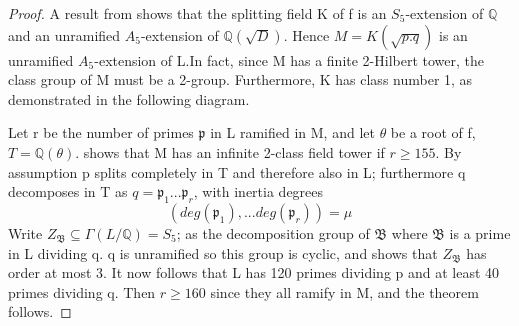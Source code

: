 \documentclass[12pt]{extarticle}
\newcommand{\Q}{\mathbb{Q}}
\newcommand{\<}{\langle}
\renewcommand{\>}{\rangle}
\theoremstyle{definition}
\begin{document}
\begin{proof}
A result from \cite{} shows that the splitting field K
of f is an $S_5$-extension of $\mathbb{Q}$ and an unramified $A_5$-extension of $\mathbb{Q}(\sqrt{D})$. Hence $M=K(\sqrt{p.q})$ is an
unramified $A_5$-extension of L.In fact, since M has a finite 2-Hilbert tower, the class group of M must be a 2-group.  Furthermore, K has class number 1, as demonstrated in the following diagram.
\begin{center}
\end{center}

Let r be the number of primes $\mathfrak{p}$ in L ramified in M, and let $\theta$ be a root of f, $T = \mathbb{Q}(\theta)$. \cite{MART1978} shows that M has an infinite 2-class field tower if $r\geq 155$. By assumption p splits completely in T and therefore also in L; furthermore q decomposes in T as $q = \mathfrak{p}_1...\mathfrak{p}_r$, with inertia degrees
\begin{equation}
    (deg(\mathfrak{p}_1),...deg(\mathfrak{p}_r))=\mu 
\end{equation}
Write $Z_\mathfrak{B}\subseteq\Gamma(L/\Q) = S_5$; as the decomposition group of $\mathfrak{B}$ where $\mathfrak{B}$ is a prime in L dividing q. q is unramified so this group is cyclic, and \cite{MART1978} shows that $Z_\mathfrak{B}$ has order at most 3.  It now follows that L has 120 primes dividing p and at least 40 primes dividing q. Then $r\geq 160$ since they all ramify in M, and the theorem follows.
\end{proof}
\end{document}
